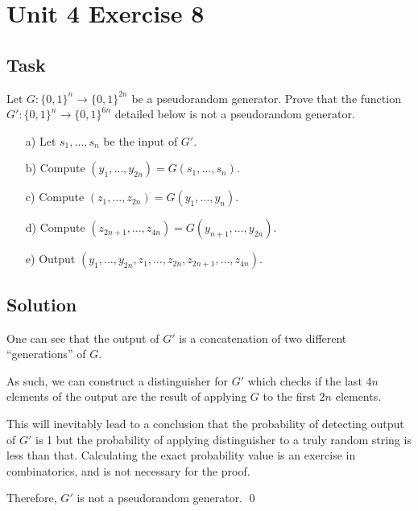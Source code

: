 \section{Unit 4 Exercise 8}

\subsection{Task}
Let $G : \{0, 1\}^n \to \{0, 1\}^{2n}$ be a pseudorandom generator.
Prove that the function $G' : \{0, 1\}^n \to \{0, 1\}^{6n}$ detailed below is not a pseudorandom generator.

\begin{enumerate}
    \item[a)] Let $s_1, \ldots, s_n$ be the input of $G'$.
    \item[b)] Compute $(y_1, \ldots, y_{2n}) = G(s_1, \ldots, s_n)$.
    \item[c)] Compute $(z_1, \ldots, z_{2n}) = G(y_1, \ldots, y_n)$.
    \item[d)] Compute $(z_{2n+1}, \ldots, z_{4n}) = G(y_{n+1}, \ldots, y_{2n})$.
    \item[e)] Output $(y_1, \ldots, y_{2n}, z_1, \ldots, z_{2n}, z_{2n+1}, \ldots, z_{4n})$.
\end{enumerate}

\subsection{Solution}

One can see that the output of $G'$ is a concatenation of two different ``generations'' of $G$.

As such, we can construct a distinguisher for $G'$ which checks if the last $4n$ elements of the output are the result of applying $G$ to the first $2n$ elements.

This will inevitably lead to a conclusion that the probability of detecting output of $G'$ is 1 but the probability of applying distinguisher to a truly random string is less than that.
Calculating the exact probability value is an exercise in combinatorics, and is not necessary for the proof.

Therefore, $G'$ is not a pseudorandom generator. \qed
